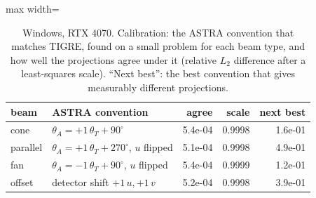 \begin{table}[H]
\centering
\caption{Windows, RTX 4070. Calibration: the ASTRA convention that matches TIGRE, found on a small problem for each beam type, and how well the projections agree under it (relative $L_2$ difference after a least-squares scale). ``Next best'': the best convention that gives measurably different projections.}
\label{tab:calib}
\small
\begin{adjustbox}{max width=\linewidth}
\begin{tabular}{llrrr}
\toprule
beam & ASTRA convention & agree & scale & next best\\
\midrule
cone & $\theta_A = +1\,\theta_T +90^\circ$ & 5.4e-04 & 0.9998 & 1.6e-01\\
parallel & $\theta_A = +1\,\theta_T +270^\circ$, $u$ flipped & 5.1e-04 & 0.9998 & 4.9e-01\\
fan & $\theta_A = -1\,\theta_T +90^\circ$, $u$ flipped & 5.4e-04 & 0.9999 & 1.2e-01\\
offset & detector shift $+1\,u, +1\,v$ & 5.2e-04 & 0.9998 & 3.9e-01\\
\bottomrule
\end{tabular}
\end{adjustbox}
\end{table}
